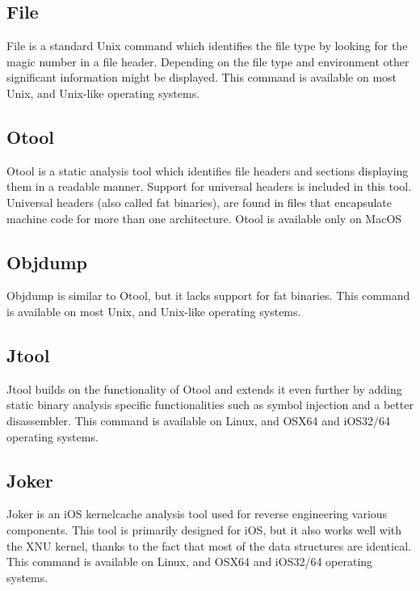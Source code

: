 \subsection{File}

File \cite{file} is a standard Unix command which identifies the file type by looking for
the magic number in a file header. Depending on the file type and environment
other significant information might be displayed. This command is available on
most Unix, and Unix-like operating systems.

\subsection{Otool}

Otool \cite{otool} is a static analysis tool which identifies file headers and sections
displaying them in a readable manner. Support for universal headers is
included in this tool. Universal headers (also called fat binaries), are found
in files that encapsulate machine code for more than one architecture. Otool
is available only on MacOS

\subsection{Objdump}

Objdump \cite{objdump} is similar to Otool, but it lacks support for fat binaries. This
command is available on most Unix, and Unix-like operating systems.

\subsection{Jtool}

Jtool \cite{jtool} builds on the functionality of Otool and extends it even further by
adding static binary analysis specific functionalities such as symbol
injection and a better disassembler. This command is available on Linux,
and OSX64 and iOS32/64 operating systems.

\subsection{Joker}

Joker \cite{joker} is an iOS kernelcache analysis tool used for reverse engineering various
components. This tool is primarily designed for iOS, but it also works well
with the XNU kernel, thanks to the fact that most of the data structures are
identical. This command is available on Linux, and OSX64 and iOS32/64
operating systems. 

